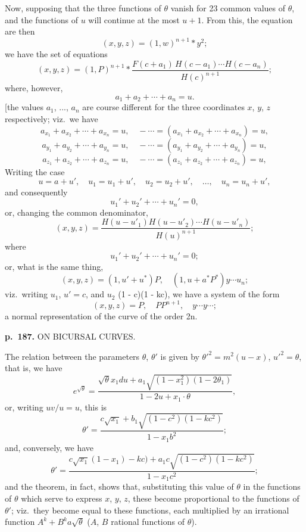 \documentclass[11pt,a4paper]{article}
\begin{document}
Now, supposing that the three functions of $\theta$ vanish for 23 common values of $\theta$, and the functions of $u$ will continue at the most $u + 1$. From this, the equation are then
\[
(x, y, z) = (1, w)^{n+1} \ast y^2;
\]
we have the set of equations
\[
(x, y, z) = (1, P)^{n+1} \ast \frac{F(c + a_1)\,H(c - a_1) \cdots H(c - a_n)}{H(c)^{n+1}};
\]
where, however,
\[
a_1 + a_2 + \cdots + a_n = u.
\]
[the values $a_1$, ..., $a_n$ are course different for the three coordinates $x$, $y$, $z$ respectively; viz.\ we have
\[
a_{x_1} + a_{x_2} + \cdots + a_{x_n} = u, \quad - \cdots = (a_{x_1} + a_{x_2} + \cdots + a_{x_n}) = u,
\]
\[
a_{y_1} + a_{y_2} + \cdots + a_{y_n} = u, \quad - \cdots = (a_{y_1} + a_{y_2} + \cdots + a_{y_n}) = u,
\]
\[
a_{z_1} + a_{z_2} + \cdots + a_{z_n} = u, \quad - \cdots = (a_{z_1} + a_{z_2} + \cdots + a_{z_n}) = u,
\]
Writing the case
\[
u = a + u', \quad u_1 = u_1 + u', \quad u_2 = u_2 + u', \quad \ldots, \quad u_n = u_n + u',
\]
and consequently
\[
u_1' + u_2' + \cdots + u_n' = 0,
\]
or, changing the common denominator,
\[
(x, y, z) = \frac{H(u - u'_1)H(u - u'_2)\cdots H(u - u'_n)}{H(u)^{n+1}};
\]
where
\[
u_1' + u_2' + \cdots + u_n' = 0;
\]
or, what is the same thing,
\[
(x, y, z) = (1, u' + u^*)P, \quad (1, u + a^*P^*)y \cdots u_n;
\]
viz.\ writing $u_1$, $u' = c$, and $u_2$ (1 - c)(1 - kc), we have a system of the form
\[
(x, y, z) = P, \quad PP^{n+1}, \quad y \cdots y \cdots;
\]
a normal representation of the curve of the order 2n.

\clearpage

\noindent
\textbf{p.~187.}  ON BICURSAL CURVES.

The relation between the parameters $\theta$, $\theta'$ is given by $\theta'^2 = m^2(u - x)$, $u'^2 = \theta$, that is, we have
\[
e^{\sqrt{\theta}} = \frac{\sqrt{\theta}x_1 du + a_1 \sqrt{(1 - x_1^2)(1 - 2\theta_1)}}{1 - 2u + x_1 \cdot \theta},
\]
or, writing $u v / u = u$, this is
\[
\theta' = \frac{c \sqrt{x_1} + b_1 \sqrt{(1 - c^2)(1 - kc^2)}}{1 - x_1 b^2};
\]
and, conversely, we have
\[
\theta' = \frac{c \sqrt{x_1}(1 - x_1) - kc) + a_1 c\sqrt{(1 - c^2)(1 - kc^2)}}{1 - x_1 c^2};
\]
and the theorem, in fact, shows that, substituting this value of $\theta$ in the functions of $\theta$ which serve to express $x$, $y$, $z$, these become proportional to the functions of $\theta'$; viz.\ they become equal to these functions, each multiplied by an irrational function $A^k + B^k a\sqrt{\theta}$ ($A$, $B$ rational functions of $\theta$).

\clearpage
\end{document}
